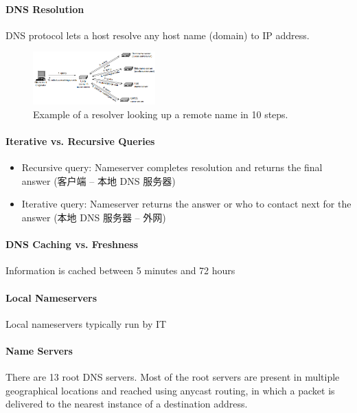 \paragraph{DNS Resolution}DNS protocol lets a host resolve any host name (domain) to IP address. 

\begin{figure}[!htb]
    \centering
    \includegraphics[width=0.42\textwidth]{pic/CN7/Example of a resolver looking up a remote name in 10 steps.}
    \caption{Example of a resolver looking up a remote name in 10 steps.}
\end{figure}

\paragraph{Iterative vs. Recursive Queries}\quad
\begin{itemize}\small
    \item Recursive query: Nameserver completes resolution and returns the final answer (客户端 -- 本地 DNS 服务器)
    \item Iterative query: Nameserver returns the answer or who to contact next for the answer (本地 DNS 服务器 -- 外网)
\end{itemize}

\paragraph{DNS Caching vs. Freshness}Information is cached between 5 minutes and 72 hours

\paragraph{Local Nameservers}Local nameservers typically run by IT

\paragraph{Name Servers}There are 13 root DNS servers. Most of the root servers are
present in multiple geographical locations and reached using
anycast routing, in which a packet is delivered to the nearest
instance of a destination address.

